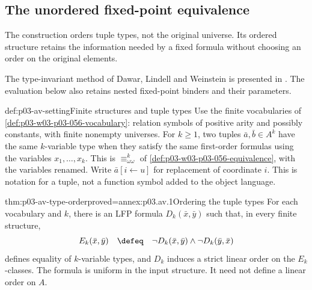 \subsection{The unordered fixed-point equivalence}
\label{sec:p03-abiteboul-vianu-completion}

The construction orders tuple types, not the original universe.
Its ordered structure retains the information needed by a fixed
formula without choosing an order on the original elements.

The type-invariant method of Dawar, Lindell and Weinstein is presented
in \cite[Chapter~11]{Libkin2004}. The evaluation below also retains
nested fixed-point binders and their parameters.

\begin{hbconvention}{def:p03-av-setting}{Finite structures and tuple types}
Use the finite vocabularies of
\cref{def:p03-w03-p03-056-vocabulary}: relation symbols of positive
arity and possibly constants, with finite nonempty universes.
For \(k\geq1\), two tuples \(\bar a,\bar b\in A^k\)
have the same \(k\)-variable type when they satisfy the same
first-order formulas using the variables \(x_1,\ldots,x_k\).
This is \(\equiv^k_{\omega\omega}\) of
\cref{def:p03-w03-p03-056-equivalence}, with the variables renamed.
Write \(\bar a[i\leftarrow u]\) for replacement of coordinate
\(i\). This is notation for a tuple, not a function symbol added
to the object language.
\end{hbconvention}

\begin{hblemma}{thm:p03-av-type-order}{proved=annex:p03.av.1}{Ordering the tuple types}
For each vocabulary and \(k\), there is an LFP formula
\(D_k(\bar x,\bar y)\) such that, in every finite structure,
\[
 E_k(\bar x,\bar y)
 \quad\defeq\quad
 \neg D_k(\bar x,\bar y)\land\neg D_k(\bar y,\bar x)
\]
defines equality of \(k\)-variable types, and \(D_k\) induces a
strict linear order on the \(E_k\)-classes. The formula is uniform
in the input structure. It need not define a linear order on \(A\).
\end{hblemma}

